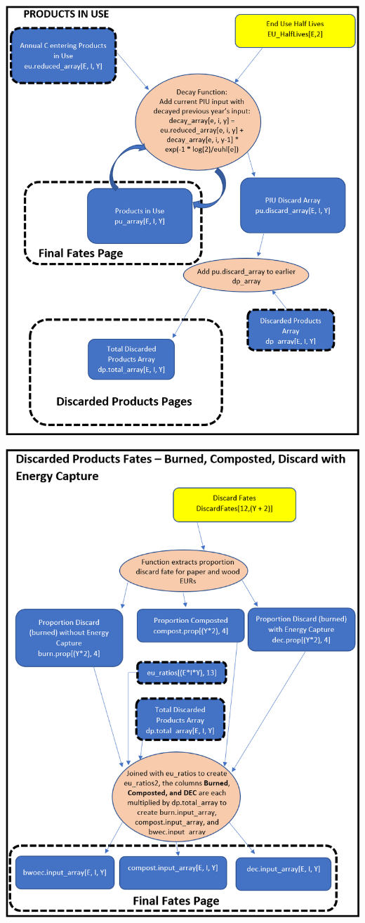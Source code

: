 \documentclass[
  openany]{book}
\begin{document}
\newpage

\includegraphics[width=1\linewidth]{images/schematic-3}

\newpage

\includegraphics[width=1\linewidth]{images/schematic-4}
\end{document}
